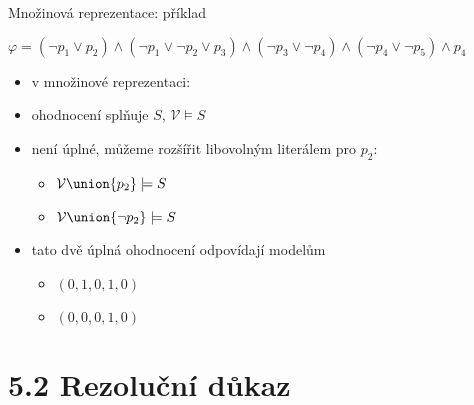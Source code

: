 \documentclass{beamer}
\begin{document}
\begin{frame}{Množinová reprezentace: příklad}
    
    $\varphi=(\neg p_1\lor p_2)\land(\neg p_1\lor\neg p_2\lor p_3)\land(\neg p_3\lor\neg p_4)\land(\neg p_4\lor \neg p_5)\land p_4$ 
    
    \pause

    \begin{itemize}
        \item v množinové reprezentaci:
        \pause
        \item ohodnocení  
        splňuje $S$, \alert{$\mathcal V\models S$}\pause
        \item není úplné, můžeme rozšířit libovolným literálem pro $p_2$: \pause
        \begin{itemize}
            \item \alert{$\mathcal V\union\{p_2\}\models S$}\pause
            \item \alert{$\mathcal V\union\{\neg p_2\}\models S$}\pause
        \end{itemize}        
        \item tato dvě úplná ohodnocení odpovídají modelům
         \begin{itemize}
            \item $(0,1,0,1,0)$
            \item $(0,0,0,1,0)$
         \end{itemize}
    \end{itemize}

\end{frame}


\section{5.2 Rezoluční důkaz}
\end{document}
